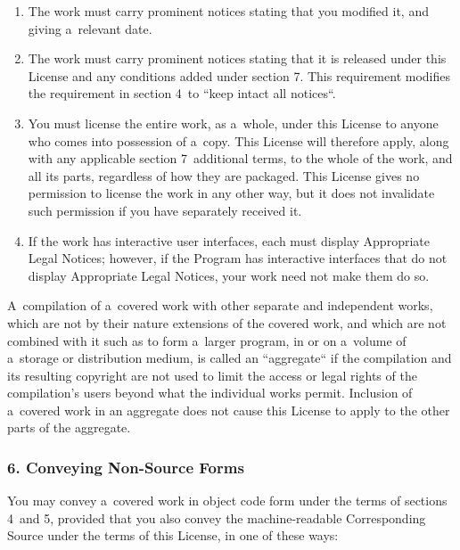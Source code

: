 \documentclass[a4paper, 11pt, twoside]{article}
\begin{document}
\begin{enumerate}[label=\Alph*)]
\item The work must carry prominent notices stating that you modified it, and giving a~relevant date.
\item The work must carry prominent notices stating that it is released under this License and any conditions added under section 7. This requirement modifies the requirement in section 4~to “keep intact all notices“.
\item You must license the entire work, as a~whole, under this License to anyone who comes into possession of a~copy. This License will therefore apply, along with any applicable section 7~additional terms, to the whole of the work, and all its parts, regardless of how they are packaged. This License gives no permission to license the work in any other way, but it does not invalidate such permission if you have separately received it.
\item If the work has interactive user interfaces, each must display Appropriate Legal Notices; however, if the Program has interactive interfaces that do not display Appropriate Legal Notices, your work need not make them do so.
\end{enumerate}

A~compilation of a~covered work with other separate and independent works, which are not by their nature extensions of the covered work, and which are not combined with it such as to form a~larger program, in or on a~volume of a~storage or distribution medium, is called an “aggregate“ if the compilation and its resulting copyright are not used to limit the access or legal rights of the compilation's users beyond what the individual works permit. Inclusion of a~covered work in an aggregate does not cause this License to apply to the other parts of the aggregate.

\subsubsection{6. Conveying Non-Source Forms}

You may convey a~covered work in object code form under the terms of sections 4~and 5, provided that you also convey the machine-readable Corresponding Source under the terms of this License, in one of these ways:
\end{document}
